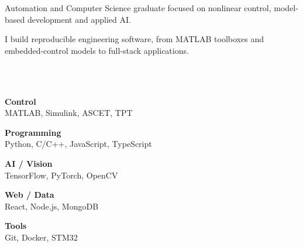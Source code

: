 \documentclass[10pt]{spidercv}
\begin{document}
\begin{SideBar}{\ColorBackground}{\ColorTextSide}
  {\small\RaggedRight
    Automation and Computer Science graduate focused on nonlinear control, model-based development and applied AI.

    \vspace{0.35cm}
    I build reproducible engineering software, from MATLAB toolboxes and embedded-control models to full-stack applications.

    \par}

  \vspace{0.55cm}
  \\[0.20cm]
  \\[0.20cm]

  \vspace{0.65cm}
  {\small\RaggedRight
    \textbf{Control}\\ MATLAB, Simulink, ASCET, TPT

    \vspace{0.18cm}
    \textbf{Programming}\\ Python, C/C++, JavaScript, TypeScript

    \vspace{0.18cm}
    \textbf{AI / Vision}\\ TensorFlow, PyTorch, OpenCV

    \vspace{0.18cm}
    \textbf{Web / Data}\\ React, Node.js, MongoDB

    \vspace{0.18cm}
    \textbf{Tools}\\ Git, Docker, STM32
    \par}

  \vspace{0.55cm}
  \\[0.20cm]
  \\[0.20cm]
  \\[0.20cm]
  \\[0.20cm]

  \vspace{0.55cm}
  \begin{SkillGauges}
  \end{SkillGauges}
\end{SideBar}
\end{document}
